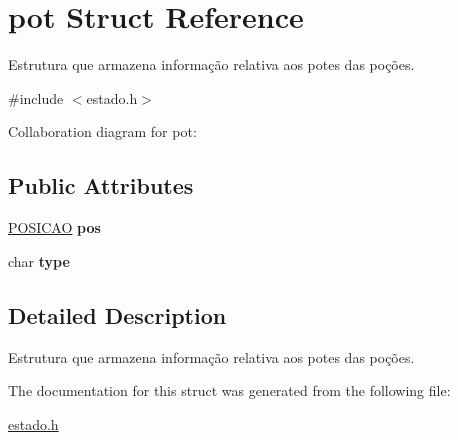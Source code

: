 \hypertarget{structpot}{}\section{pot Struct Reference}
\label{structpot}


Estrutura que armazena informação relativa aos potes das poções.  




{\ttfamily \#include $<$estado.\+h$>$}



Collaboration diagram for pot\+:
\subsection*{Public Attributes}
\begin{DoxyCompactItemize}
\item 
\hyperlink{estado_8h_a55b3f4b56938eeb8fa5e8f9c07baf1b0}{P\+O\+S\+I\+C\+AO} {\bfseries pos}\hypertarget{structpot_a567d3d061b1ba5c0969b7d121ccdf0b1}{}\label{structpot_a567d3d061b1ba5c0969b7d121ccdf0b1}

\item 
char {\bfseries type}\hypertarget{structpot_ae978368ba8bfdb6570edc48763e99534}{}\label{structpot_ae978368ba8bfdb6570edc48763e99534}

\end{DoxyCompactItemize}


\subsection{Detailed Description}
Estrutura que armazena informação relativa aos potes das poções. 

The documentation for this struct was generated from the following file\+:\begin{DoxyCompactItemize}
\item 
\hyperlink{estado_8h}{estado.\+h}\end{DoxyCompactItemize}
